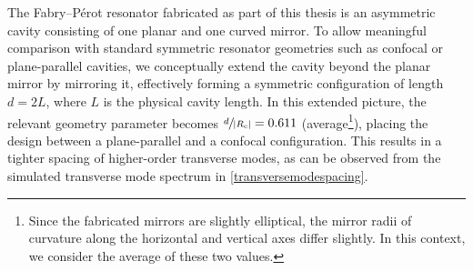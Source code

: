 \documentclass[../Thesis-IJspeert.tex]{subfiles}
\begin{document}
The Fabry--Pérot resonator fabricated as part of this thesis is an asymmetric cavity consisting of one planar and one curved mirror. To allow meaningful comparison with standard symmetric resonator geometries such as confocal or plane-parallel cavities, we conceptually extend the cavity beyond the planar mirror by mirroring it, effectively forming a symmetric configuration of length $d = 2L$, where $L$ is the physical cavity length. In this extended picture, the relevant geometry parameter becomes $\sfrac{d}{\lvert R_\mathrm{c} \rvert} = 0.611$ (average\footnote{Since the fabricated mirrors are slightly elliptical, the mirror radii of curvature along the horizontal and vertical axes differ slightly. In this context, we consider the average of these two values.}), placing the design between a plane-parallel and a confocal configuration. This results in a tighter spacing of higher-order transverse modes, as can be observed from the simulated transverse mode spectrum in \autoref{transversemodespacing}.
\end{document}

